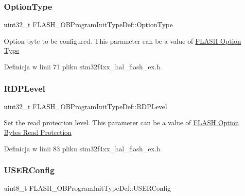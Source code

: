 \subsubsection{\texorpdfstring{Option\+Type}{OptionType}}
{\footnotesize\ttfamily uint32\+\_\+t F\+L\+A\+S\+H\+\_\+\+O\+B\+Program\+Init\+Type\+Def\+::\+Option\+Type}

Option byte to be configured. This parameter can be a value of \hyperlink{group___f_l_a_s_h_ex___option___type}{F\+L\+A\+SH Option Type} 

Definicja w linii 71 pliku stm32f4xx\+\_\+hal\+\_\+flash\+\_\+ex.\+h.

\mbox{\label{struct_f_l_a_s_h___o_b_program_init_type_def_a1f613ba2b87cf9caa84dc1d493e96dae}} 
\subsubsection{\texorpdfstring{R\+D\+P\+Level}{RDPLevel}}
{\footnotesize\ttfamily uint32\+\_\+t F\+L\+A\+S\+H\+\_\+\+O\+B\+Program\+Init\+Type\+Def\+::\+R\+D\+P\+Level}

Set the read protection level. This parameter can be a value of \hyperlink{group___f_l_a_s_h_ex___option___bytes___read___protection}{F\+L\+A\+SH Option Bytes Read Protection} 

Definicja w linii 83 pliku stm32f4xx\+\_\+hal\+\_\+flash\+\_\+ex.\+h.

\mbox{\label{struct_f_l_a_s_h___o_b_program_init_type_def_ae6c9b55d49bc9627a2319ba680a924de}} 
\subsubsection{\texorpdfstring{U\+S\+E\+R\+Config}{USERConfig}}
{\footnotesize\ttfamily uint8\+\_\+t F\+L\+A\+S\+H\+\_\+\+O\+B\+Program\+Init\+Type\+Def\+::\+U\+S\+E\+R\+Config}

